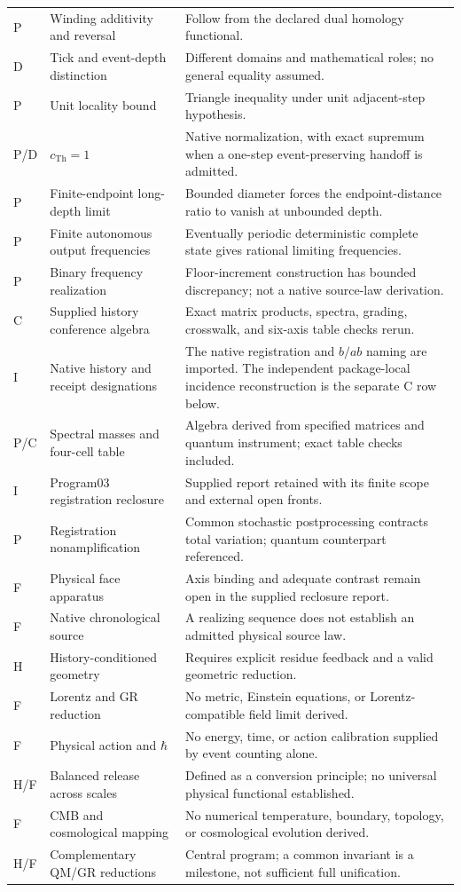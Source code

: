 \begin{longtable}{@{}p{}p{}p{}@{}}
P & Winding additivity and reversal & Follow from the declared dual homology functional. \\
D & Tick and event-depth distinction & Different domains and mathematical roles; no general equality assumed. \\
P & Unit locality bound & Triangle inequality under unit adjacent-step hypothesis. \\
P/D & $c_{\mathrm{Th}}=1$ & Native normalization, with exact supremum when a one-step event-preserving handoff is admitted. \\
P & Finite-endpoint long-depth limit & Bounded diameter forces the endpoint-distance ratio to vanish at unbounded depth. \\
P & Finite autonomous output frequencies & Eventually periodic deterministic complete state gives rational limiting frequencies. \\
P & Binary frequency realization & Floor-increment construction has bounded discrepancy; not a native source-law derivation. \\
C & Supplied history conference algebra & Exact matrix products, spectra, grading, crosswalk, and six-axis table checks rerun. \\
I & Native history and receipt designations & The native registration and $b/ab$ naming are imported. The independent package-local incidence reconstruction is the separate C row below. \\
P/C & Spectral masses and four-cell table & Algebra derived from specified matrices and quantum instrument; exact table checks included. \\
I & Program03 registration reclosure & Supplied report retained with its finite scope and external open fronts. \\
P & Registration nonamplification & Common stochastic postprocessing contracts total variation; quantum counterpart referenced. \\
F & Physical face apparatus & Axis binding and adequate contrast remain open in the supplied reclosure report. \\
F & Native chronological source & A realizing sequence does not establish an admitted physical source law. \\
H & History-conditioned geometry & Requires explicit residue feedback and a valid geometric reduction. \\
F & Lorentz and GR reduction & No metric, Einstein equations, or Lorentz-compatible field limit derived. \\
F & Physical action and $\hbar$ & No energy, time, or action calibration supplied by event counting alone. \\
H/F & Balanced release across scales & Defined as a conversion principle; no universal physical functional established. \\
F & CMB and cosmological mapping & No numerical temperature, boundary, topology, or cosmological evolution derived. \\
H/F & Complementary QM/GR reductions & Central program; a common invariant is a milestone, not sufficient full unification. \\


\end{longtable}
